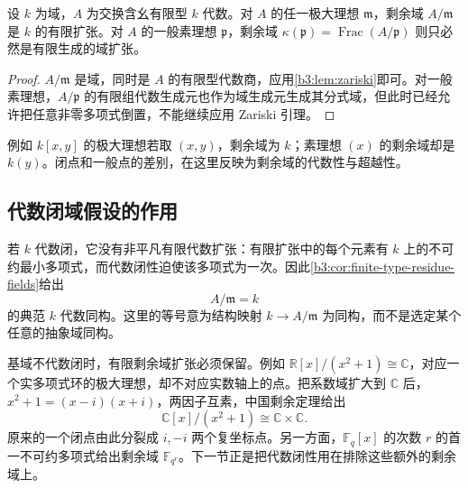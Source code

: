 \begin{corollary}\label{b3:cor:finite-type-residue-fields}
	设 \(k\) 为域，\(A\) 为交换含幺有限型 \(k\) 代数。对 \(A\) 的任一极大理想 \(\mathfrak m\)，剩余域 \(A/\mathfrak m\) 是 \(k\) 的有限扩张。对 \(A\) 的一般素理想 \(\mathfrak p\)，剩余域 \(\kappa(\mathfrak p)=\operatorname{Frac}(A/\mathfrak p)\) 则只必然是有限生成的域扩张。
\end{corollary}
\begin{proof}
	\(A/\mathfrak m\) 是域，同时是 \(A\) 的有限型代数商，应用\cref{b3:lem:zariski}即可。对一般素理想，\(A/\mathfrak p\) 的有限组代数生成元也作为域生成元生成其分式域，但此时已经允许把任意非零多项式倒置，不能继续应用 Zariski 引理。
\end{proof}

例如 \(k[x,y]\) 的极大理想若取 \((x,y)\)，剩余域为 \(k\)；素理想 \((x)\) 的剩余域却是 \(k(y)\)。闭点和一般点的差别，在这里反映为剩余域的代数性与超越性。

\subsection{代数闭域假设的作用}\label{b3:subsec:0601:03}

若 \(k\) 代数闭，它没有非平凡有限代数扩张：有限扩张中的每个元素有 \(k\) 上的不可约最小多项式，而代数闭性迫使该多项式为一次。因此\cref{b3:cor:finite-type-residue-fields}给出
\[
	A/\mathfrak m=k
\]
的典范 \(k\) 代数同构。这里的等号意为结构映射 \(k\to A/\mathfrak m\) 为同构，而不是选定某个任意的抽象域同构。

\ProseParagraphBreak
基域不代数闭时，有限剩余域扩张必须保留。例如 \(\mathbb R[x]/(x^2+1)\cong\mathbb C\)，对应一个实多项式环的极大理想，却不对应实数轴上的点。把系数域扩大到 \(\mathbb C\) 后，\(x^2+1=(x-i)(x+i)\)，两因子互素，中国剩余定理给出
\[
	\mathbb C[x]/(x^2+1)\cong\mathbb C\times\mathbb C.
\]
原来的一个闭点由此分裂成 \(i,-i\) 两个复坐标点。另一方面，\(\mathbb F_q[x]\) 的次数 \(r\) 的首一不可约多项式给出剩余域 \(\mathbb F_{q^r}\)。下一节正是把代数闭性用在排除这些额外的剩余域上。
